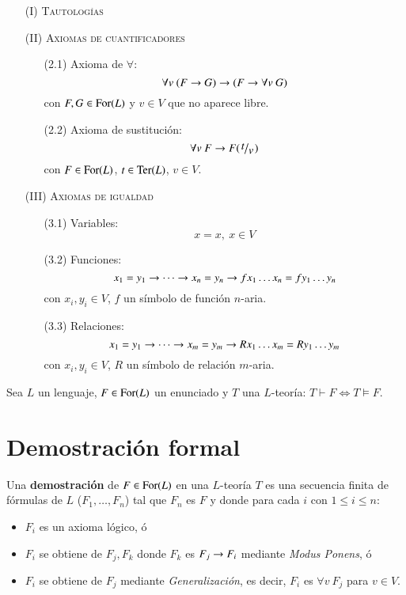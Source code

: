 \begin{dfn}$ $
    \begin{enumerate}
        \item[(I)] \textsc{Tautologías}
        \item[(II)] \textsc{Axiomas de cuantificadores}
        \begin{itemize}
            \item[(2.1)] Axioma de $\forall$:
            $$
                \forall v\ (F \rightarrow G) \rightarrow (F \rightarrow \forall v\ G)
            $$
            con $F, G \in \mathrm{For}(L)$ y $v \in V$ que no aparece libre.
            \item[(2.2)] Axioma de sustitución:
            $$
                \forall v\ F \then F(\quo{t}{v})
            $$
            con $F \in \mathrm{For}(L)$, $t \in \mathrm{Ter}(L)$, $v \in V$.
        \end{itemize}
        \item[(III)] \textsc{Axiomas de igualdad}
        \begin{itemize}
            \item[(3.1)] Variables:
            $$
                x = x,\ x\in V
            $$
            \item[(3.2)] Funciones:
            $$
                x_1 = y_1 \rightarrow \cdots \rightarrow x_n = y_n \rightarrow f x_1 \ldots x_n = f y_1 \ldots y_n
            $$
            con $x_i, y_i \in V$, $f$ un símbolo de función $n$-aria.
            \item[(3.3)] Relaciones:
            $$
                x_1 = y_1 \rightarrow \cdots \rightarrow x_m = y_m \rightarrow R x_1 \ldots x_m = R y_1 \ldots y_m
            $$
            con $x_i, y_i \in V$, $R$ un símbolo de relación $m$-aria.
        \end{itemize}
    \end{enumerate}
\end{dfn}

\begin{pro}
    Sea $L$ un lenguaje, $F \in \mathrm{For}(L)$ un enunciado y $T$ una $L$-teoría: $T \vdash F \iff T \vDash F$.
\end{pro}

\section{Demostración formal}
\begin{dfn}[Demostración]
    Una \textbf{demostración} de $F \in \mathrm{For}(L)$ en una $L$-teoría $T$ es una secuencia finita de fórmulas de $L$ ($F_1, \ldots, F_n$) tal que $F_n$ es $F$ y donde para cada $i$ con $1 \leq i \leq n$:
    \begin{itemize}
        \item $F_i$ es un axioma lógico, ó
        \item $F_i$ se obtiene de $F_j, F_k$ donde $F_k$ es $F_j \rightarrow F_i$ mediante \textit{Modus Ponens}, ó
        \item $F_i$ se obtiene de $F_j$ mediante \textit{Generalización}, es decir, $F_i$ es $\forall v\ F_j$ para $v \in V$.
    \end{itemize}
\end{dfn}

